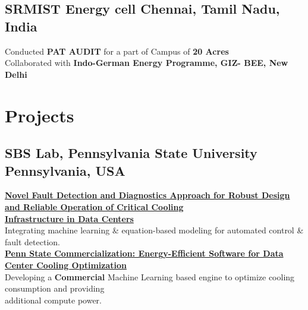 \documentclass[]{Keval-resume}
\begin{document}
{{\subsection{SRMIST Energy cell \hfill \normalfont C\lowercase{hennai,} T\lowercase{amil} N\lowercase{adu,} I\lowercase{ndia}}
\hspace{1.5em} \textbullet{} Conducted \textbf{PAT AUDIT} for a part of Campus of  \textbf{20 Acres} \\
\hspace{1.5em} \textbullet{} Collaborated with \textbf{Indo-German Energy Programme, GIZ-
BEE, New Delhi} 


\sectionsep

\section{Projects}
\hrulefill
\postsectionsep

\subsection{SBS Lab, Pennsylvania State University \hfill \normalfont P\lowercase{ennsylvania,}  USA}

\href{https://sites.psu.edu/sbslab/research/buildings/data-center-fdd/}{\textbf{Novel Fault Detection and Diagnostics Approach for Robust Design and Reliable Operation of Critical Cooling \\Infrastructure in Data Centers}}\\
\hspace{1.5em} \textbullet{} Integrating machine learning \& equation-based modeling for automated control \& fault detection.\\

\href{https://sites.psu.edu/sbslab/research/buildings/psu-gap-datacenter/}{\textbf{Penn State Commercialization: Energy-Efficient Software for Data Center Cooling Optimization}}\\
\hspace{1.5em} \textbullet{} Developing a \textbf{Commercial} Machine Learning based engine to optimize cooling consumption and providing \\additional compute power.\\

}}
\end{document}

